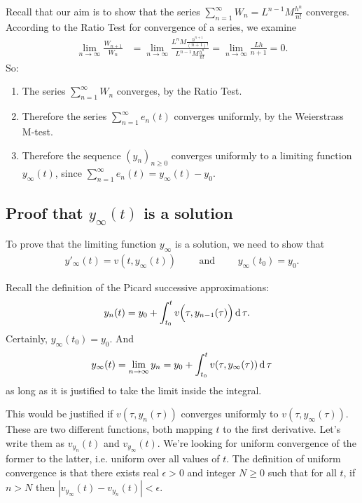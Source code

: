 Recall that our aim is to show that the series
$\sum_{n=1}^\infty W_n = L^{n-1}M\frac{h^n}{n!}$ converges. According to the
Ratio Test for convergence of a series, we examine
\begin{align*}
  \lim_{n\to \infty} \frac{W_{n+1}}{W_n}
  &= \lim_{n\to\infty} \frac{L^nM\frac{h^{n+1}}{(n+1)!}}
                          {L^{n-1}M\frac{h^n}{n!}}
   = \lim_{n\to\infty} \frac{Lh}{n+1}
    = 0.
\end{align*}
So:
\begin{enumerate}
\item The series $\sum_{n=1}^\infty W_n$ converges, by the Ratio Test.
\item Therefore the series $\sum_{n=1}^\infty e_n(t)$ converges uniformly, by
  the Weierstrass M-test.
\item Therefore the sequence $(y_n)_{n\geq 0}$ converges uniformly to a
  limiting function $y_\infty(t)$, since
  $\sum_{n=1}^\infty e_n(t) = y_\infty(t) - y_0$.
\end{enumerate}

\subsection{Proof that $y_\infty(t)$ is a solution}

To prove that the limiting function $y_\infty$ is a solution, we need to show
that
\begin{align*}
  y'_\infty(t) = v(t, y_\infty(t)) \text{~~~~~~~and~~~~~~~} y_\infty(t_0) = y_0.
\end{align*}

Recall the definition of the Picard successive approximations:
\begin{align*}
    y_n(t) &= y_0 + \int_{t_0}^t v\Big(\tau, y_{n-1}(\tau)\Big) \operatorname{\text{d}}\tau.
\end{align*}
Certainly, $y_\infty(t_0) = y_0$. And
\begin{align*}
  y_\infty(t) = \lim_{n\to \infty} y_n = y_0 + \int_{t_0}^t v(\tau, y_\infty(\tau)) \operatorname{\text{d}}\tau
\end{align*}
as long as it is justified to take the limit inside the integral.

This would be justified if $v(\tau, y_n(\tau))$ converges uniformly to
$v(\tau, y_\infty(\tau))$. These are two different functions, both mapping $t$
to the first derivative. Let's write them as $v_{y_n}(t)$ and
$v_{y_\infty}(t)$. We're looking for uniform convergence of the former to the
latter, i.e. uniform over all values of $t$. The definition of uniform
convergence is that there exists real $\epsilon > 0$ and integer $N \geq 0$
such that for all $t$, if $n > N$ then
$|v_{y_\infty}(t) - v_{y_n}(t)| < \epsilon$.

